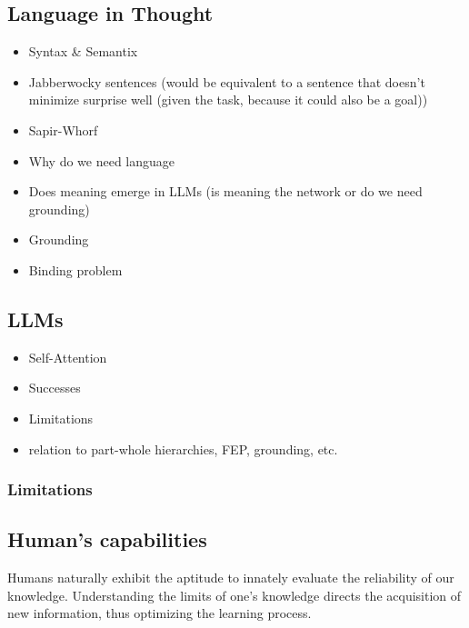 \subsection{Language in Thought}
\begin{itemize}
    \item Syntax \& Semantix
    \item Jabberwocky sentences (would be equivalent to a sentence that doesn't minimize surprise well (given the task, because it could also be a goal))
\end{itemize}

\begin{itemize}
    \item Sapir-Whorf
    \item Why do we need language
    \item Does meaning emerge in LLMs (is meaning the network or do we need grounding)
    \item Grounding
    \item Binding problem
\end{itemize}

\subsection{LLMs}
\begin{itemize}
    \item Self-Attention
    \item Successes
    \item Limitations
    \item relation to part-whole hierarchies, FEP, grounding, etc. 
\end{itemize}

\subsubsection{Limitations}

\subsection{Human's capabilities}
Humans naturally exhibit the aptitude to innately evaluate the reliability of our knowledge. Understanding the limits of one's knowledge directs the acquisition of new information, thus optimizing the learning process.

